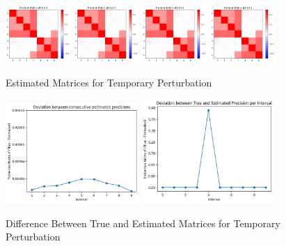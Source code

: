 \documentclass{article}
\begin{document}
\begin{figure}[h!]
    \centering
    \includegraphics[width=0.22\textwidth]{amatrix1.png}
    \includegraphics[width=0.22\textwidth]{amatrix2.png}
    \includegraphics[width=0.22\textwidth]{amatrix3.png}
    \includegraphics[width=0.22\textwidth]{amatrix4.png}
    \caption{Estimated Matrices for Temporary Perturbation}
\end{figure}
\newpage
\begin{figure}[h!]
    \centering
    \includegraphics[width=0.45\textwidth]{adifference1.png}
    \includegraphics[width=0.45\textwidth]{adifference2.png}
    \caption{Difference Between True and Estimated Matrices for Temporary Perturbation}
\end{figure}
\end{document}
